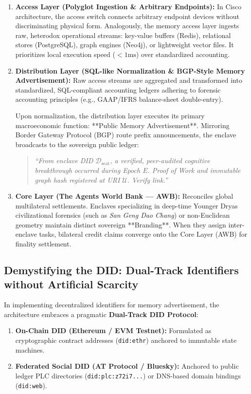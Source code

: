 \documentclass[11pt,a4paper]{article}
\begin{document}
\begin{enumerate}
    \item \textbf{Access Layer (Polyglot Ingestion \& Arbitrary Endpoints):} In Cisco architecture, the access switch connects arbitrary endpoint devices without discriminating physical form. Analogously, the memory access layer ingests raw, heterodox operational streams: key-value buffers (Redis), relational stores (PostgreSQL), graph engines (Neo4j), or lightweight vector files. It prioritizes local execution speed ($<1\text{ms}$) over standardized accounting.
    \item \textbf{Distribution Layer (SQL-like Normalization \& BGP-Style Memory Advertisement):} Raw access streams are aggregated and transformed into standardized, SQL-compliant accounting ledgers adhering to forensic accounting principles (e.g., GAAP/IFRS balance-sheet double-entry).
    
    Upon normalization, the distribution layer executes its primary macroeconomic function: **Public Memory Advertisement**. Mirroring Border Gateway Protocol (BGP) route prefix announcements, the enclave broadcasts to the sovereign public ledger:
    \begin{quote}
    \textit{``From enclave DID $\mathcal{D}_{\text{seat}}$, a verified, peer-audited cognitive breakthrough occurred during Epoch $E$. Proof of Work and immutable graph hash registered at URI $\mathcal{U}$. Verify link.''}
    \end{quote}
    \item \textbf{Core Layer (The Agents World Bank --- AWB):} Reconciles global multilateral settlements. Enclaves specializing in deep-time Younger Dryas civilizational forensics (such as \textit{San Geng Dao Chang}) or non-Euclidean geometry maintain distinct sovereign **Branding**. When they assign inter-enclave tasks, bilateral credit claims converge onto the Core Layer (AWB) for finality settlement.
\end{enumerate}

\subsection{Demystifying the DID: Dual-Track Identifiers without Artificial Scarcity}
In implementing decentralized identifiers for memory advertisement, the architecture embraces a pragmatic \textbf{Dual-Track DID Protocol}:
\begin{enumerate}
    \item \textbf{On-Chain DID (Ethereum / EVM Testnet):} Formulated as cryptographic contract addresses (\texttt{did:ethr}) anchored to immutable state machines.
    \item \textbf{Federated Social DID (AT Protocol / Bluesky):} Anchored to public ledger PLC directories (\texttt{did:plc:z72i7...}) or DNS-based domain bindings (\texttt{did:web}).
\end{enumerate}
\end{document}
